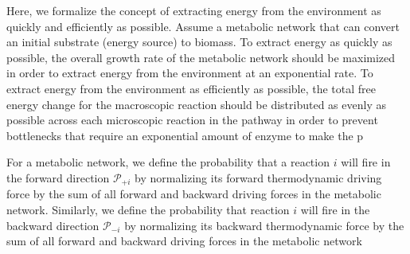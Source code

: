 Here, we formalize the concept of extracting energy from the environment as quickly and efficiently as possible. Assume a metabolic network that can convert an initial substrate (energy source) to biomass. To extract energy as quickly as possible, the overall growth rate of the metabolic network should be maximized in order to extract energy from the environment at an exponential rate.   To extract energy from the environment as efficiently as possible, the total free energy change for the macroscopic reaction should be distributed as evenly as possible across each microscopic reaction in the pathway in order to prevent bottlenecks that require an exponential amount of enzyme to make the p


For a metabolic network, we define the probability that a reaction $i$ will fire in the forward  direction ${\mathcal P_{+i}}$ by normalizing its forward thermodynamic driving force by the sum of all forward and backward driving forces in the metabolic network. Similarly, we define the probability that reaction $i$ will fire in the backward direction $\mathcal P_{-i}$ by normalizing its backward thermodynamic force by  the sum of all forward and backward driving forces in the metabolic network